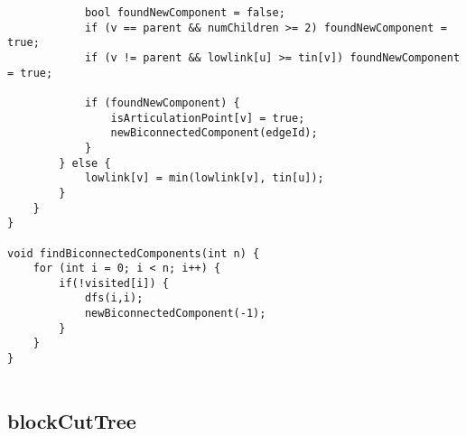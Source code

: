 \documentclass[landscape,twocolumn,10pt,a4paper]{article}
\begin{document}
\begin{verbatim}
            bool foundNewComponent = false;
            if (v == parent && numChildren >= 2) foundNewComponent = true;
            if (v != parent && lowlink[u] >= tin[v]) foundNewComponent = true;

            if (foundNewComponent) {
                isArticulationPoint[v] = true;
                newBiconnectedComponent(edgeId);
            }
        } else {
            lowlink[v] = min(lowlink[v], tin[u]);
        }
    }
}

void findBiconnectedComponents(int n) {
    for (int i = 0; i < n; i++) {
        if(!visited[i]) {
            dfs(i,i);
            newBiconnectedComponent(-1);
        }
    }
}


\end{verbatim}

\subsection{blockCutTree}
\end{document}
